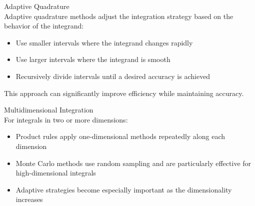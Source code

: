 \begin{concept}{Adaptive Quadrature}\\
Adaptive quadrature methods adjust the integration strategy based on the behavior of the integrand:
\begin{itemize}
    \item Use smaller intervals where the integrand changes rapidly
    \item Use larger intervals where the integrand is smooth
    \item Recursively divide intervals until a desired accuracy is achieved
\end{itemize}

This approach can significantly improve efficiency while maintaining accuracy.
\end{concept}

\begin{concept}{Multidimensional Integration}\\
For integrals in two or more dimensions:
\begin{itemize}
    \item Product rules apply one-dimensional methods repeatedly along each dimension
    \item Monte Carlo methods use random sampling and are particularly effective for high-dimensional integrals
    \item Adaptive strategies become especially important as the dimensionality increases
\end{itemize}
\end{concept}

